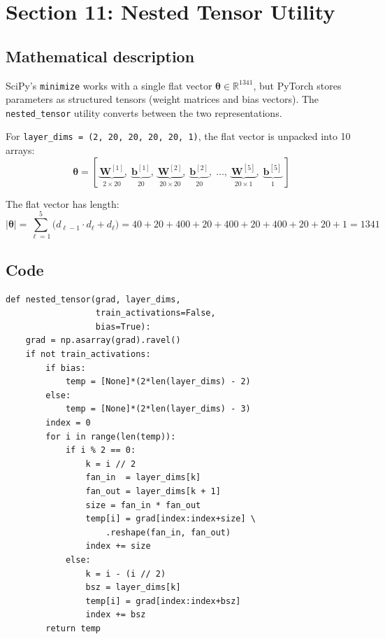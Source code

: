 \documentclass[11pt,a4paper]{article}
\begin{document}
\section{Section 11: Nested Tensor Utility}
\label{sec:nested}

\subsection*{Mathematical description}

SciPy's \texttt{minimize} works with a single flat vector
$\bm\theta \in \mathbb{R}^{1341}$, but PyTorch stores parameters as
structured tensors (weight matrices and bias vectors).  The
\texttt{nested\_tensor} utility converts between the two representations.

For \texttt{layer\_dims = (2, 20, 20, 20, 20, 1)}, the flat vector is
unpacked into 10 arrays:
\[
  \bm\theta = [\,
    \underbrace{\bm{W}^{[1]}}_{2\times 20},\;
    \underbrace{\bm{b}^{[1]}}_{20},\;
    \underbrace{\bm{W}^{[2]}}_{20\times 20},\;
    \underbrace{\bm{b}^{[2]}}_{20},\;
    \ldots,\;
    \underbrace{\bm{W}^{[5]}}_{20\times 1},\;
    \underbrace{\bm{b}^{[5]}}_{1}
  \,]
\]

The flat vector has length:
\[
  |\bm\theta| = \sum_{\ell=1}^{5}
  \bigl(d_{\ell-1} \cdot d_\ell + d_\ell\bigr)
  = 40{+}20 + 400{+}20 + 400{+}20 + 400{+}20 + 20{+}1 = 1341
\]

\subsection*{Code}

\begin{lstlisting}
def nested_tensor(grad, layer_dims,
                  train_activations=False,
                  bias=True):
    grad = np.asarray(grad).ravel()
    if not train_activations:
        if bias:
            temp = [None]*(2*len(layer_dims) - 2)
        else:
            temp = [None]*(2*len(layer_dims) - 3)
        index = 0
        for i in range(len(temp)):
            if i % 2 == 0:
                k = i // 2
                fan_in  = layer_dims[k]
                fan_out = layer_dims[k + 1]
                size = fan_in * fan_out
                temp[i] = grad[index:index+size] \
                    .reshape(fan_in, fan_out)
                index += size
            else:
                k = i - (i // 2)
                bsz = layer_dims[k]
                temp[i] = grad[index:index+bsz]
                index += bsz
        return temp
\end{lstlisting}
\end{document}

